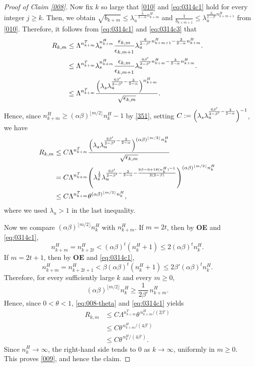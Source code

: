 \documentclass{amsart}
\theoremstyle{plain}
\theoremstyle{definition}
\theoremstyle{remark}
\numberwithin{equation}{section}
\begin{document}
\begin{proof}[Proof of Claim \ref{008}]
Now fix $k$ so large that
\eqref{010} and \eqref{eq:0314c1} hold for every integer $j\ge k$.
Then, we obtain
$
\sqrt{b_{k+m}}
\le
\lambda_u^{-\frac{3}{2-\alpha}n_{k+m}^H}
$ and
$\frac{1}{b_{k+m+1}}
\le
\lambda_u^{\frac{6}{2-\beta'}n_{k+m+1}^H}
$ from \eqref{010}.
Therefore, it follows from \eqref{eq:0314c1} and \eqref{eq:0314c3} that
\begin{align*}
R_{k,m}
&\le
\Lambda^{n^T_{k+m}}\lambda_s^{n^H_{k+m}}
\frac{\epsilon_{k,m}}{\epsilon_{k,m+1}}
\lambda_u^{\frac{6}{2-\beta'}n^H_{k+m+1}-\frac{3}{2-\alpha}n^H_{k+m}}.
\\
&\le
\Lambda^{n^T_{k+m}}\lambda_s^{n^H_{k+m}}
\frac{\epsilon_{k,m}}{\epsilon_{k,m+1}}
\lambda_u^{\frac{6\beta'}{2-\beta'}n^H_{k+m}-\frac{3}{2-\alpha}n^H_{k+m}}.
\\
&\le
\Lambda^{n^T_{k+m}}
\frac{\Bigl(\lambda_s\lambda_u^{\frac{6\beta'}{2-\beta'}-\frac{3}{2-\alpha}}\Bigr)^{n^H_{k+m}}}{\sqrt{\epsilon_{k,m}}}.
\end{align*}
Hence, since $n_{k+m}^H\ge (\alpha\beta)^{\lfloor m/2\rfloor}n_k^H-1$ by \eqref{351}, setting $C:=\Bigl(\lambda_s\lambda_u^{\frac{6\beta'}{2-\beta'}-\frac{3}{2-\alpha}}\Bigr)^{-1}$, we have
\begin{align}\label{eq:008-theta}
\begin{split}
 R_{k,m}
&\le
C 
\Lambda^{n^T_{k+m}}
\frac{\Bigl(\lambda_s\lambda_u^{\frac{6\beta'}{2-\beta'}-\frac{3}{2-\alpha}}\Bigr)^{(\alpha\beta)^{\lfloor m/2\rfloor}n_k^H}}{\sqrt{\epsilon_{k,m}}}\\
&=
C 
\Lambda^{n^T_{k+m}}
\Biggl(
\lambda_s^{\frac12}
\lambda_u^{\frac{6\beta'}{2-\beta'}-\frac{3}{2-\alpha}-\frac{9\beta-6+18(n_k^H)^{-1}}{2(2-\beta)}}
\Biggr)^{(\alpha\beta)^{\lfloor m/2\rfloor}n_k^H}\\
&\le
C 
\Lambda^{n^T_{k+m}}
\theta^{(\alpha\beta)^{\lfloor m/2\rfloor}n_k^H},
\end{split}
\end{align}
where we used $\lambda_u >1$ in the last inequality.

Now we compare $(\alpha\beta)^{\lfloor m/2\rfloor}n_k^H$ with $n_{k+m}^H$.
If $m=2t$, then by {\bf OE} and \eqref{eq:0314c1},
\[
n_{k+m}^H=n_{k+2t}^H<(\alpha\beta)^t(n_k^H+1)\le 2(\alpha\beta)^t n_k^H.
\]
If $m=2t+1$, then by {\bf OE} and \eqref{eq:0314c1},
\[
n_{k+m}^H=n_{k+2t+1}^H<\beta(\alpha\beta)^t(n_k^H+1)\le 2\beta'(\alpha\beta)^t n_k^H.
\]
Therefore, for every sufficiently large $k$ and every $m\ge0$,
\[
(\alpha\beta)^{\lfloor m/2\rfloor}n_k^H\ge \frac{1}{2\beta'}\,n_{k+m}^H.
\]
Hence, since $0<\theta<1$, \eqref{eq:008-theta} and \eqref{eq:0314c1} yields
\begin{align*}
R_{k,m}
&\le
C 
\Lambda^{n^T_{k+m}}
\theta^{\,n_{k+m}^H/(2\beta')}\\
&\le
C 
\theta^{\,n_{k+m}^H/(4\beta')}\\
&\le
C 
\theta^{\,n_k^H/(4\beta')}.
\end{align*}
Since $n_k^H\to\infty$, the right-hand side tends to $0$ as $k\to\infty$, uniformly in $m\ge0$.
This proves \eqref{009}, and hence the claim.
\end{proof}
\end{document}
